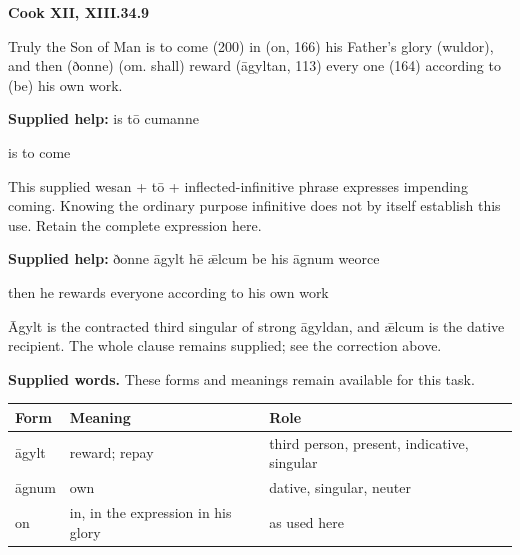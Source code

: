 \par\begin{minipage}{\linewidth}\raggedright
\textbf{Cook XII, XIII.34.9}

Truly the Son of Man is to come (200) in (on, 166) his Father’s glory (wuldor), and then (ðonne) (om. shall) reward (āgyltan, 113) every one (164) according to (be) his own work.

\textbf{Supplied help:} is tō cumanne

is to come

This supplied wesan + tō + inflected-infinitive phrase expresses impending coming. Knowing the ordinary purpose infinitive does not by itself establish this use. Retain the complete expression here.

\textbf{Supplied help:} ðonne āgylt hē ǣlcum be his āgnum weorce

then he rewards everyone according to his own work

Āgylt is the contracted third singular of strong āgyldan, and ǣlcum is the dative recipient. The whole clause remains supplied; see the correction above.

\end{minipage}\par\addvspace{4pt}

\textbf{Supplied words.} These forms and meanings remain available for this task.

\par\begingroup
\fontsize{10.5}{13.2}\selectfont
\setlength{\LTleft}{0pt}\setlength{\LTright}{\fill}
\noindent
\begin{tabular}{@{}>{\raggedright\arraybackslash}p{21.06mm}>{\raggedright\arraybackslash}p{43.81mm}>{\raggedright\arraybackslash}p{53.5mm}@{}}
\toprule
\textbf{Form} & \textbf{Meaning} & \textbf{Role} \\
\midrule
āgylt & reward; repay & third person, present, indicative, singular \\
āgnum & own & dative, singular, neuter \\
on & in, in the expression in his glory & as used here \\
\bottomrule
\end{tabular}
\par\endgroup

